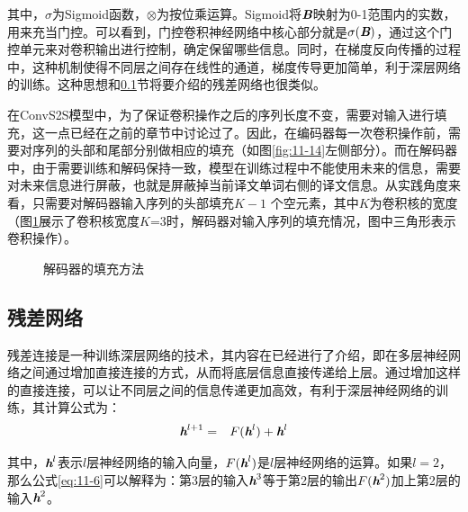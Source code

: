 \noindent 其中，$\sigma$为Sigmoid函数，$\otimes$为按位乘运算。Sigmoid将$\textbf{\em B}$映射为0-1范围内的实数，用来充当门控。可以看到，门控卷积神经网络中核心部分就是$\sigma ( \textbf{\em B} )$，通过这个门控单元来对卷积输出进行控制，确定保留哪些信息。同时，在梯度反向传播的过程中，这种机制使得不同层之间存在线性的通道，梯度传导更加简单，利于深层网络的训练。这种思想和\ref{sec:11.2.3}节将要介绍的残差网络也很类似。

\parinterval 在ConvS2S模型中，为了保证卷积操作之后的序列长度不变，需要对输入进行填充，这一点已经在之前的章节中讨论过了。因此，在编码器每一次卷积操作前，需要对序列的头部和尾部分别做相应的填充（如图\ref{fig:11-14}左侧部分）。而在解码器中，由于需要训练和解码保持一致，模型在训练过程中不能使用未来的信息，需要对未来信息进行屏蔽，也就是屏蔽掉当前译文单词右侧的译文信息。从实践角度来看，只需要对解码器输入序列的头部填充$K-1$ 个空元素，其中$K$为卷积核的宽度（图\ref{fig:11-15}展示了卷积核宽度$K$=3时，解码器对输入序列的填充情况，图中三角形表示卷积操作）。

\begin{figure}[htp]
\centering

\caption{解码器的填充方法}
\label{fig:11-15}
\end{figure}


\subsection{残差网络}
\label{sec:11.2.3}

\parinterval 残差连接是一种训练深层网络的技术，其内容在{\chapternine}已经进行了介绍，即在多层神经网络之间通过增加直接连接的方式，从而将底层信息直接传递给上层。通过增加这样的直接连接，可以让不同层之间的信息传递更加高效，有利于深层神经网络的训练，其计算公式为：
\begin{eqnarray}
\textbf{\em h}^{l+1} &=& F (\textbf{\em h}^l) + \textbf{\em h}^l
\label{eq:11-6}
\end{eqnarray}

\noindent 其中，$\textbf{\em h}^l$表示$l$层神经网络的输入向量，${F} (\textbf{\em h}^l)$是$l$层神经网络的运算。如果$l=2$，那么公式\eqref{eq:11-6}可以解释为：第3层的输入$\textbf{\em h}^3$等于第2层的输出${F}(\textbf{\em h}^2)$加上第2层的输入$\textbf{\em h}^2$。

